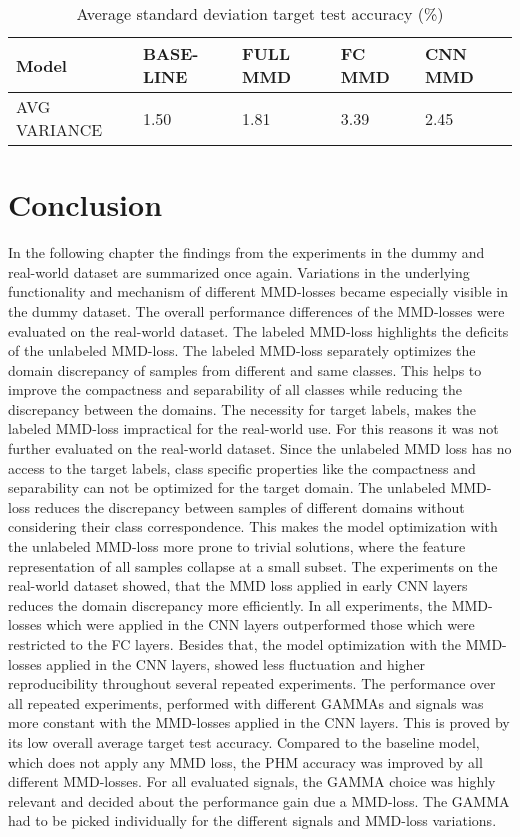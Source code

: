 \begin {table}[H]
\centering
\begin{tabular}{lllll}
  \toprule
  Model & BASE-LINE & FULL MMD & FC MMD & CNN MMD\\
  \midrule
  AVG VARIANCE & 1.50 & 1.81 & 3.39 & 2.45\\
  \bottomrule
\end{tabular}
\caption {Average standard deviation target test accuracy (\%)} \label{tab:Average_Variance_Accuracy} 
\end {table}

\section{Conclusion}
In the following chapter the findings from the experiments in the dummy and real-world dataset are summarized once again. Variations in the underlying functionality and mechanism of different MMD-losses became especially visible in the dummy dataset. The overall performance differences of the MMD-losses were evaluated on the real-world dataset. The labeled MMD-loss highlights the deficits of the unlabeled MMD-loss. The labeled MMD-loss separately optimizes the domain discrepancy of samples from different and same classes. This helps to improve the compactness and separability of all classes while reducing the discrepancy between the domains. The necessity for target labels, makes the labeled MMD-loss impractical for the real-world use. For this reasons it was not further evaluated on the real-world dataset. Since the unlabeled MMD loss has no access to the target labels, class specific properties like the compactness and separability can not be optimized for the target domain. The unlabeled MMD-loss reduces the discrepancy between samples of different domains without considering their class correspondence. This makes the model optimization with the unlabeled MMD-loss more prone to trivial solutions, where the feature representation of all samples collapse at a small subset. The experiments on the real-world dataset showed, that the MMD loss applied in early CNN layers reduces the domain discrepancy more efficiently. In all experiments, the MMD-losses which were applied in the CNN layers outperformed those which were restricted to the FC layers. Besides that, the model optimization with the MMD-losses applied in the CNN layers, showed less fluctuation and higher reproducibility throughout several repeated experiments. The performance over all repeated experiments, performed with different GAMMAs and signals was more constant with the MMD-losses applied in the CNN layers. This is proved by its low overall average target test accuracy. Compared to the baseline model, which does not apply any MMD loss, the PHM accuracy was improved by all different MMD-losses. For all evaluated signals, the GAMMA choice was highly relevant and decided about the performance gain due a MMD-loss. The GAMMA had to be picked individually for the different signals and MMD-loss variations. 